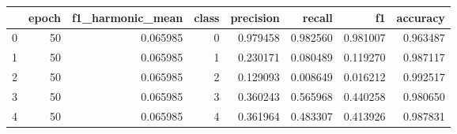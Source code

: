 \begin{tabular}{lrrrrrrr}
\toprule
 & epoch & f1_harmonic_mean & class & precision & recall & f1 & accuracy \\
\midrule
0 & 50 & 0.065985 & 0 & 0.979458 & 0.982560 & 0.981007 & 0.963487 \\
1 & 50 & 0.065985 & 1 & 0.230171 & 0.080489 & 0.119270 & 0.987117 \\
2 & 50 & 0.065985 & 2 & 0.129093 & 0.008649 & 0.016212 & 0.992517 \\
3 & 50 & 0.065985 & 3 & 0.360243 & 0.565968 & 0.440258 & 0.980650 \\
4 & 50 & 0.065985 & 4 & 0.361964 & 0.483307 & 0.413926 & 0.987831 \\
\bottomrule
\end{tabular}
